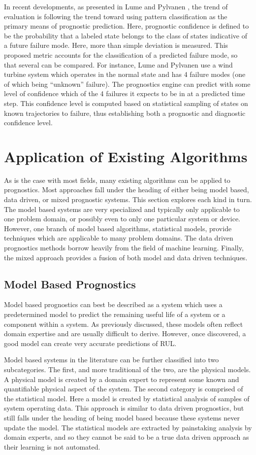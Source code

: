 \documentclass[12pt]{article}
\begin{document}
In recent developments, as presented in Lume and Pylvanen \cite{6299510}, the
trend of evaluation is following the trend toward using pattern classification
as the primary means of prognostic prediction.  Here, prognostic confidence is
defined to be the probability that a labeled state belongs to the class of
states indicative of a future failure mode.  Here, more than simple deviation
is measured.  This proposed metric accounts for the classification of a
predicted failure mode, so that several can be compared.  For instance, Lume
and Pylvanen use a wind turbine system which operates in the normal state and
has 4 failure modes (one of which being ``unknown'' failure).  The prognostics
engine can predict with some level of confidence which of the 4 failures it
expects to be in at a predicted time step.  This confidence level is computed
based on statistical sampling of states on known trajectories to failure, thus
establishing both a prognostic and diagnostic confidence level.


\section{Application of Existing Algorithms}
As is the case with most fields, many existing algorithms can be applied to
prognostics.  Most approaches fall under the heading of either being model
based, data driven, or mixed prognostic systems.  This section explores each
kind in turn. The model based systems are very specialized and typically only
applicable to one problem domain, or possibly even to only one particular
system or device.  However, one branch of model based algorithms, statistical
models, provide techniques which are applicable to many problem domains.  The
data driven prognostics methods borrow heavily from the field of machine
learning.  Finally, the mixed approach provides a fusion of both model and data
driven techniques.

\subsection{Model Based Prognostics}
Model based prognostics can best be described as a system which uses a
predetermined model to predict the remaining useful life of a system or a
component within a system.  As previously discussed, these models often reflect
domain expertise and are usually difficult to derive.  However, once
discovered, a good model can create very accurate predictions of RUL.  

Model based systems in the literature can be further classified into two
subcategories.  The first, and more traditional of the two, are the physical
models.  A physical model is created by a domain expert to represent some known
and quantifiable physical aspect of the system. The second category is
comprised of the statistical model.  Here a model is created by statistical
analysis of samples of system operating data.  This approach is similar to data
driven prognostics, but still falls under the heading of being model based
because these systems never update the model.  The statistical models are
extracted by painstaking analysis by domain experts, and so they cannot be said
to be a true data driven approach as their learning is not automated.
\end{document}
